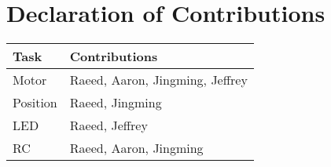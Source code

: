 \section*{Declaration of Contributions}
\begin{table}[htp]
\centering
\begin{tabular}{|l|l|}
\hline
    Task        & Contributions                         \\ \hline
    Motor       & Raeed, Aaron, Jingming, Jeffrey       \\ \hline
    Position    & Raeed, Jingming                       \\ \hline
    LED         & Raeed, Jeffrey                        \\ \hline
    RC          & Raeed, Aaron, Jingming                \\ \hline
\end{tabular}
\end{table}